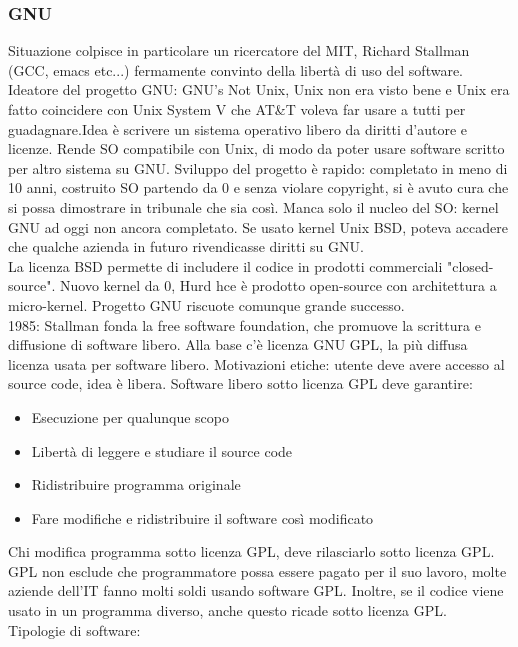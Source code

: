 \documentclass[18px]{article}
\begin{document}
\subsubsection{GNU}
Situazione colpisce in particolare un ricercatore del MIT, Richard Stallman (GCC, emacs etc...) fermamente convinto della libertà di uso del software. Ideatore del progetto GNU: GNU's Not Unix, Unix non era visto bene e Unix era fatto coincidere con Unix System V che AT\&T voleva far usare a tutti per guadagnare.Idea è scrivere un sistema operativo libero da diritti d'autore e licenze. Rende SO compatibile con Unix, di modo da poter usare software scritto per altro sistema su GNU. Sviluppo del progetto è rapido: completato in meno di 10 anni, costruito SO partendo da 0 e senza violare copyright, si è avuto cura che si possa dimostrare in tribunale che sia così. Manca solo il nucleo del SO: kernel GNU ad oggi non ancora completato. Se usato kernel Unix BSD, poteva accadere che qualche azienda in futuro rivendicasse diritti su GNU.\\ La licenza BSD permette di includere il codice in prodotti commerciali "closed-source". Nuovo kernel da 0, Hurd hce è prodotto open-source con architettura a micro-kernel. Progetto GNU riscuote comunque grande successo.\\ 1985: Stallman fonda la free software foundation, che promuove la scrittura e diffusione di software libero. Alla base c'è licenza GNU GPL, la più diffusa licenza usata per software libero. Motivazioni etiche: utente deve avere accesso al source code, idea è libera. Software libero sotto licenza GPL deve garantire:
\begin{itemize}
\item Esecuzione per qualunque scopo
\item Libertà di leggere e studiare il source code
\item Ridistribuire programma originale
\item Fare modifiche e ridistribuire il software così modificato
\end{itemize}
Chi modifica programma sotto licenza GPL, deve rilasciarlo sotto licenza GPL. GPL non esclude che programmatore possa essere pagato per il suo lavoro, molte aziende dell'IT fanno molti soldi usando software GPL. Inoltre, se il codice viene usato in un programma diverso, anche questo ricade sotto licenza GPL.\\ Tipologie di software:
\end{document}
